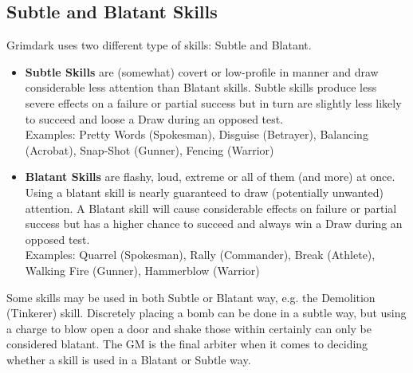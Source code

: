 \subsection{Subtle and Blatant Skills}
\label{skill_types}
Grimdark uses two different type of skills: Subtle and Blatant.
\begin{itemize}
	\item \textbf{Subtle Skills} are (somewhat) covert or low-profile in manner and draw considerable less attention than Blatant skills. 
	Subtle skills produce less severe effects on a failure or partial success but in turn are slightly less likely to succeed and loose a Draw during an opposed test.\\
	Examples: Pretty Words (Spokesman), Disguise (Betrayer), Balancing (Acrobat), Snap-Shot (Gunner), Fencing (Warrior)

	\item \textbf{Blatant Skills} are flashy, loud, extreme or all of them (and more) at once. 
	Using a blatant skill is nearly guaranteed to draw (potentially unwanted) attention.
	A Blatant skill will cause considerable effects on failure or partial success but has a higher chance to succeed and always win a Draw during an opposed test.\\
	Examples: Quarrel (Spokesman), Rally (Commander), Break (Athlete), Walking Fire (Gunner), Hammerblow (Warrior)
\end{itemize}
Some skills may be used in both Subtle or Blatant way, e.g. the Demolition (Tinkerer) skill. 
Discretely placing a bomb can be done in a subtle way, but using a charge to blow open a door and shake those within certainly can only be considered blatant.
The GM is the final arbiter when it comes to deciding whether a skill is used in a Blatant or Subtle way.
